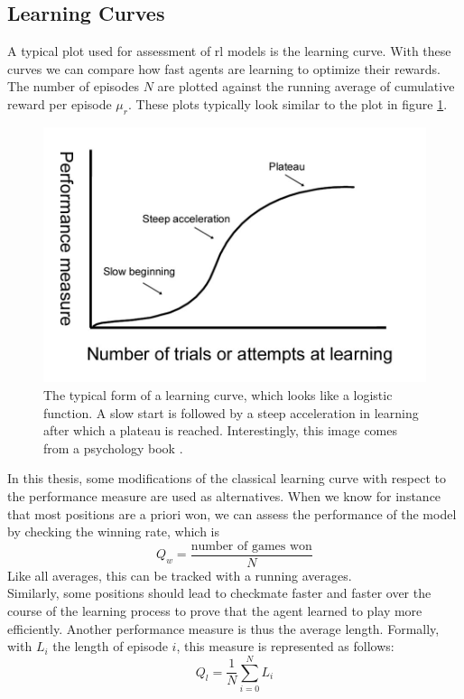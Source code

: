 \subsection{Learning Curves}
\label{subsec:lc}
A typical plot used for assessment of \gls{rl} models is the learning curve. With these curves we can compare how fast agents are learning to optimize their rewards. The number of episodes $N$ are plotted against the running average of cumulative reward per episode $\mu_r$. These plots typically look similar to the plot in figure \ref{fig:psych}.\\
\begin{figure}
\centering
\includegraphics[]{fig/learning_curve}
\caption[learning curve]{The typical form of a learning curve, which looks like a logistic function. A slow start is followed by a steep acceleration in learning after which a plateau is reached. Interestingly, this image comes from a psychology book \cite{psych}.}
\label{fig:psych}
\end{figure}
In this thesis, some modifications of the classical learning curve with respect to the performance measure are used as alternatives. When we know for instance that most positions are a priori won, we can assess the performance of the model by checking the winning rate, which is
\[
Q_w=\frac{\text{number of games won}}{N}
\]
Like all averages, this can be tracked with a running averages.\\
Similarly, some positions should lead to checkmate faster and faster over the course of the learning process to prove that the agent learned to play more efficiently. Another performance measure is thus the average length. Formally, with $L_i$ the length of episode $i$, this measure is represented as follows:
\[
Q_l=\frac{1}{N}\sum_{i=0}^{N}L_i
\]

